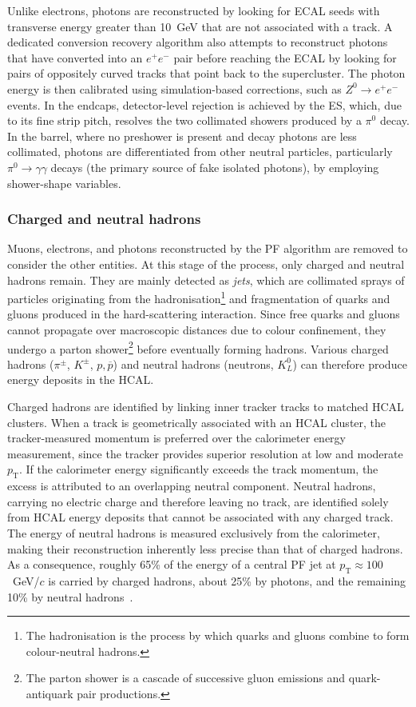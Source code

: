 Unlike electrons, photons are reconstructed by looking for ECAL seeds with transverse energy greater than 10~GeV that are not associated with a track. A dedicated conversion recovery algorithm also attempts to reconstruct photons that have converted into an $e^+e^-$ pair before reaching the ECAL by looking for pairs of oppositely curved tracks that point back to the supercluster. The photon energy is then calibrated using simulation-based corrections, such as $Z^0 \to e^+e^-$ events. In the endcaps, detector-level rejection is achieved by the ES, which, due to its fine strip pitch, resolves the two collimated showers produced by a $\pi^0$ decay. In the barrel, where no preshower is present and decay photons are less collimated, photons are differentiated from other neutral particles, particularly $\pi^0 \to \gamma\gamma$ decays (the primary source of fake isolated photons), by employing shower-shape variables.


\subsubsection{Charged and neutral hadrons}

Muons, electrons, and photons reconstructed by the PF algorithm are removed to consider the other entities. At this stage of the process, only charged and neutral hadrons remain. They are mainly detected as \textit{jets}, which are collimated sprays of particles originating from the hadronisation\footnote{The hadronisation is the process by which quarks and gluons combine to form colour-neutral hadrons.} and fragmentation of quarks and gluons produced in the hard-scattering interaction. Since free quarks and gluons cannot propagate over macroscopic distances due to colour confinement, they undergo a parton shower\footnote{The parton shower is a cascade of successive gluon emissions and quark-antiquark pair productions.} before eventually forming hadrons. Various charged hadrons ($\pi^\pm$, $K^\pm$, $p,\overline{p}$) and neutral hadrons (neutrons, $K^0_L$) can therefore produce energy deposits in the HCAL.

Charged hadrons are identified by linking inner tracker tracks to matched HCAL clusters. When a track is geometrically associated with an HCAL cluster, the tracker-measured momentum is preferred over the calorimeter energy measurement, since the tracker provides superior resolution at low and moderate $p_{\mathrm{T}}$. If the calorimeter energy significantly exceeds the track momentum, the excess is attributed to an overlapping neutral component. Neutral hadrons, carrying no electric charge and therefore leaving no track, are identified solely from HCAL energy deposits that cannot be associated with any charged track. The energy of neutral hadrons is measured exclusively from the calorimeter, making their reconstruction inherently less precise than that of charged hadrons. As a consequence, roughly 65\% of the energy of a central PF jet at $p_{\mathrm{T}} \approx 100$~GeV/$c$ is carried by charged hadrons, about 25\% by photons, and the remaining 10\% by neutral hadrons~\cite{ChargedNeutralHadronPerf}.



